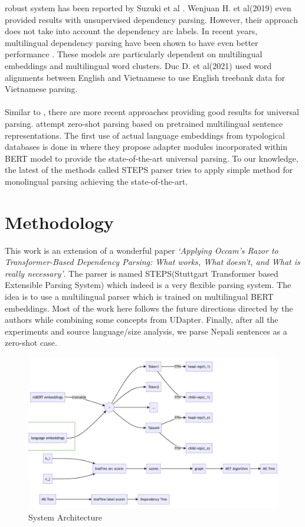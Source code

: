 robust system has been reported by Suzuki et al \cite{semiSupervised2}. Wenjuan
H. et al(2019)\cite{unsupervisedDP} even provided results with unsupervised
dependency parsing. However, their approach does not take into account the
dependency arc labels. In recent years, multilingual dependency parsing have
been shown to have even better performance \cite{malopa,multilingualCaseStudy}.
These models are particularly dependent on multilingual embeddings
\cite{multiEmbedding} and multilingual word clusters. Duc D. et
al(2021)\cite{vietnamese} used word alignments between English and Vietnamese
to use English treebank data for Vietnamese parsing.
\\~\\
Similar to \cite{malopa}, there are more recent approaches providing good
results for universal parsing. \cite{zero-shot} attempt zero-shot parsing based
on pretrained multilingual sentence representations. The first use of actual
language embeddings from typological databases is done in \cite{udapter} where
they propose adapter modules incorporated within BERT model to provide the
state-of-the-art universal parsing. To our knowledge, the latest of the methods
called STEPS parser tries to apply simple method for monolingual parsing
achieving the state-of-the-art.

\section{Methodology}
This work is an extension of a wonderful paper \textit{`Applying Occam's Razor
to Transformer-Based Dependency Parsing: What works, What doesn't, and What is
really necessary'}\cite{steps-parser}. The parser is named STEPS(Stuttgart
Transformer based Extensible Parsing System) which indeed is a very flexible
parsing system. The idea is to use a multilingual parser which is trained on
multilingual BERT embeddings. Most of the work here follows the future
directions directed by the authors\cite{steps-parser} while combining some
concepts from UDapter\cite{udapter}. Finally, after all the experiments and
source language/size analysis, we parse Nepali sentences as a zero-shot case.

\begin{figure}[!h]
    \center
    \includegraphics[trim={0 0 7.3cm 0},clip,scale=0.15]{images/Thesis_Architecture}
    \caption{System Architecture}
    \label{system_architecture}
\end{figure}

